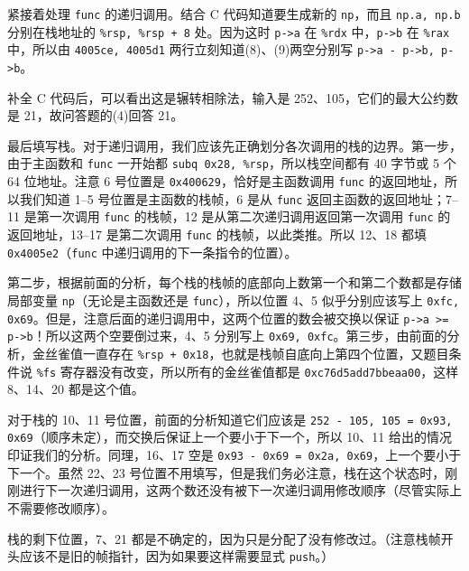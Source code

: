\begin{problems}
        紧接着处理 \verb|func| 的递归调用。结合 C 代码知道要生成新的 \verb|np|，而且 \verb|np.a, np.b| 分别在栈地址的 \verb|%rsp, %rsp + 8| 处。因为这时 \verb|p->a| 在 \verb|%rdx| 中，\verb|p->b| 在 \verb|%rax| 中，所以由 \verb|4005ce, 4005d1| 两行立刻知道(8)、(9)两空分别写 \verb|p->a - p->b, p->b|。

        补全 C 代码后，可以看出这是辗转相除法，输入是 252、105，它们的最大公约数是 21，故问答题的(4)回答 21。

        最后填写栈。对于递归调用，我们应该先正确划分各次调用的栈的边界。第一步，由于主函数和 \verb|func| 一开始都 \verb|subq 0x28, %rsp|，所以栈空间都有 40 字节或 5 个 64 位地址。注意 6 号位置是 \verb|0x400629|，恰好是主函数调用 \verb|func| 的返回地址，所以我们知道 1--5 号位置是主函数的栈帧，6 是从 \verb|func| 返回主函数的返回地址；7--11 是第一次调用 \verb|func| 的栈帧，12 是从第二次递归调用返回第一次调用 \verb|func| 的返回地址，13--17 是第二次调用 \verb|func| 的栈帧，以此类推。所以 12、18 都填 \verb|0x4005e2|（\verb|func| 中递归调用的下一条指令的位置）。
        
        第二步，根据前面的分析，每个栈的栈帧的底部向上数第一个和第二个数都是存储局部变量 \verb|np|（无论是主函数还是 \verb|func|），所以位置 4、5 似乎分别应该写上 \verb|0xfc, 0x69|。但是，注意后面的递归调用中，这两个位置的数会被交换以保证 \verb|p->a >= p->b|！所以这两个空要倒过来，4、5 分别写上 \verb|0x69, 0xfc|。第三步，由前面的分析，金丝雀值一直存在 \verb|%rsp + 0x18|，也就是栈帧自底向上第四个位置，又题目条件说 \verb|%fs| 寄存器没有改变，所以所有的金丝雀值都是 \verb|0xc76d5add7bbeaa00|，这样 8、14、20 都是这个值。

        对于栈的 10、11 号位置，前面的分析知道它们应该是 \verb|252 - 105, 105 = 0x93, 0x69|（顺序未定），而交换后保证上一个要小于下一个，所以 10、11 给出的情况印证我们的分析。同理，16、17 空是 \verb|0x93 - 0x69 = 0x2a, 0x69|，上一个要小于下一个。虽然 22、23 号位置不用填写，但是我们务必注意，栈在这个状态时，刚刚进行下一次递归调用，这两个数还没有被下一次递归调用修改顺序（尽管实际上不需要修改顺序）。

        栈的剩下位置，7、21 都是不确定的，因为只是分配了没有修改过。（注意栈帧开头应该不是旧的帧指针，因为如果要这样需要显式 \verb|push|。）
    \end{problems}

